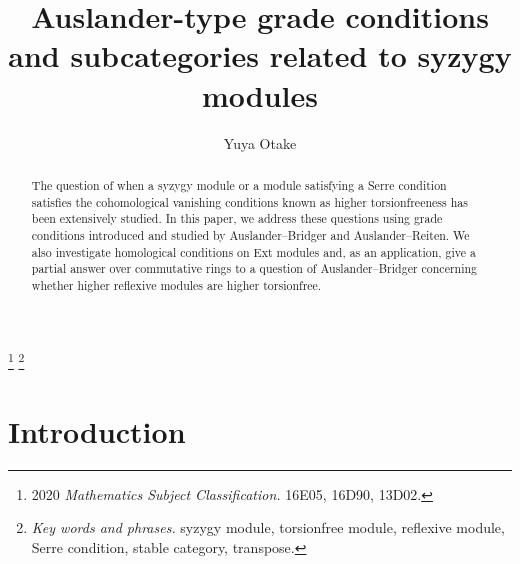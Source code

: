 \documentclass{amsart}
\theoremstyle{definition}
\theoremstyle{remark}
\numberwithin{equation}{thm}
\begin{document}
\allowdisplaybreaks
\title[Auslander-type grade conditions and subcategories related to syzygy modules]{Auslander-type grade conditions and subcategories related to syzygy modules}
\author{Yuya Otake}
\address{Graduate School of Mathematical Sciences, The University of Tokyo, 3-8-1 Komaba, Meguro-ku, Tokyo 153-8914, Japan}

\thanks{2020 {\em Mathematics Subject Classification.} 16E05, 16D90, 13D02.}
\thanks{{\em Key words and phrases.}  syzygy module, torsionfree module, reflexive module, Serre condition, stable category, transpose.}
\begin{abstract}
The question of when a syzygy module or a module satisfying a Serre condition satisfies the cohomological vanishing conditions known as higher torsionfreeness has been extensively studied. In this paper, we address these questions using grade conditions introduced and studied by Auslander--Bridger and Auslander--Reiten. We also investigate homological conditions on Ext modules and, as an application, give a partial answer over commutative rings to a question of Auslander--Bridger concerning whether higher reflexive modules are higher torsionfree.
\end{abstract}
\maketitle
\tableofcontents
\section{Introduction}
\end{document}
